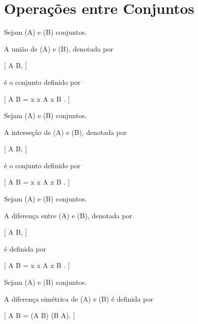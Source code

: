 \documentclass[../../main]{subfiles}
\begin{document}
\section{Operações entre Conjuntos}
\label{sec:matematica:teoria-conjuntos:operacoes-entre-conjuntos}

\begin{defn}[União]
	\label{def:matematica:teoria-conjuntos:operacoes:uniao}

	Sejam (A) e (B) conjuntos.

	A união de (A) e (B), denotada por

		[
			A \cup B,
		]

	é o conjunto definido por

	[
	A \cup B
	=
	{
	x
	\mid
	x \in A
	\lor
	x \in B
	}.
	]

\end{defn}

\begin{defn}[Interseção]
	\label{def:matematica:teoria-conjuntos:operacoes:intersecao}

	Sejam (A) e (B) conjuntos.

	A interseção de (A) e (B), denotada por

		[
			A \cap B,
		]

	é o conjunto definido por

	[
	A \cap B
	=
	{
	x
	\mid
	x \in A
	\land
	x \in B
	}.
	]

\end{defn}

\begin{defn}[Diferença]
	\label{def:matematica:teoria-conjuntos:operacoes:diferenca}

	Sejam (A) e (B) conjuntos.

	A diferença entre (A) e (B), denotada por

		[
			A \setminus B,
		]

	é definida por

	[
	A \setminus B
	=
	{
	x
	\mid
	x \in A
	\land
	x \notin B
	}.
	]

\end{defn}

\begin{defn}
	\label{def:matematica:teoria-conjuntos:operacoes:diferenca-simetrica}

	Sejam (A) e (B) conjuntos.

	A diferença simétrica de (A) e (B) é definida por

		[
			A \triangle B
			=
			(A \setminus B)
			\cup
			(B \setminus A).
		]

\end{defn}
\end{document}
